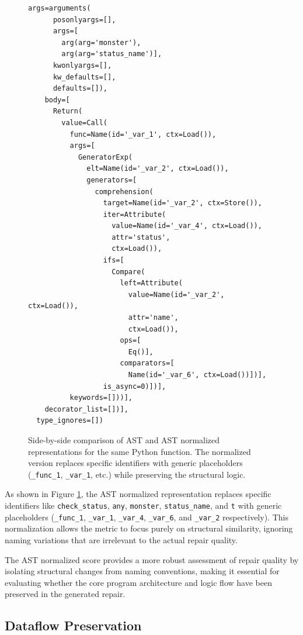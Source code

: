 \begin{figure}[h!]
\begin{minipage}{0.50\textwidth}
\begin{lstlisting}[basicstyle=\ttfamily\tiny, frame=single, breaklines=true]
    args=arguments(
      posonlyargs=[],
      args=[
        arg(arg='monster'),
        arg(arg='status_name')],
      kwonlyargs=[],
      kw_defaults=[],
      defaults=[]),
    body=[
      Return(
        value=Call(
          func=Name(id='_var_1', ctx=Load()),
          args=[
            GeneratorExp(
              elt=Name(id='_var_2', ctx=Load()),
              generators=[
                comprehension(
                  target=Name(id='_var_2', ctx=Store()),
                  iter=Attribute(
                    value=Name(id='_var_4', ctx=Load()),
                    attr='status',
                    ctx=Load()),
                  ifs=[
                    Compare(
                      left=Attribute(
                        value=Name(id='_var_2', ctx=Load()),
                        attr='name',
                        ctx=Load()),
                      ops=[
                        Eq()],
                      comparators=[
                        Name(id='_var_6', ctx=Load())])],
                  is_async=0)])],
          keywords=[]))],
    decorator_list=[])],
  type_ignores=[])
\end{lstlisting}
\end{minipage}
\caption{Side-by-side comparison of AST and AST normalized representations for the same Python function. The normalized version replaces specific identifiers with generic placeholders (\texttt{\_func\_1}, \texttt{\_var\_1}, etc.) while preserving the structural logic.}
\label{fig:ast-comparison}
\end{figure}

As shown in Figure \ref{fig:ast-comparison}, the AST normalized representation replaces specific identifiers like \texttt{check\_status}, \texttt{any}, \texttt{monster}, \texttt{status\_name}, and \texttt{t} with generic placeholders (\texttt{\_func\_1}, \texttt{\_var\_1}, \texttt{\_var\_4}, \texttt{\_var\_6}, and \texttt{\_var\_2} respectively). This normalization allows the metric to focus purely on structural similarity, ignoring naming variations that are irrelevant to the actual repair quality.

The AST normalized score provides a more robust assessment of repair quality by isolating structural changes from naming conventions, making it essential for evaluating whether the core program architecture and logic flow have been preserved in the generated repair.

\subsection{Dataflow Preservation}

